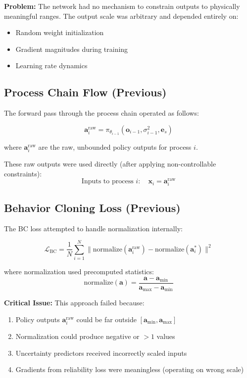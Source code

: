 \documentclass[11pt,a4paper]{article}
\begin{document}
\textbf{Problem:} The network had no mechanism to constrain outputs to physically meaningful ranges. The output scale was arbitrary and depended entirely on:
\begin{itemize}
    \item Random weight initialization
    \item Gradient magnitudes during training
    \item Learning rate dynamics
\end{itemize}

\subsection{Process Chain Flow (Previous)}

The forward pass through the process chain operated as follows:

\begin{equation}
\mathbf{a}_i^{\text{raw}} = \pi_{\theta_{i-1}}(\mathbf{o}_{i-1}, \sigma^2_{i-1}, \mathbf{e}_s)
\end{equation}

where $\mathbf{a}_i^{\text{raw}}$ are the raw, unbounded policy outputs for process $i$.

These raw outputs were used directly (after applying non-controllable constraints):
\begin{equation}
\text{Inputs to process } i: \quad \mathbf{x}_i = \mathbf{a}_i^{\text{raw}}
\end{equation}

\subsection{Behavior Cloning Loss (Previous)}

The BC loss attempted to handle normalization internally:

\begin{equation}
\mathcal{L}_{\text{BC}} = \frac{1}{N} \sum_{i=1}^N \| \text{normalize}(\mathbf{a}_i^{\text{raw}}) - \text{normalize}(\mathbf{a}_i^*) \|^2
\end{equation}

where normalization used precomputed statistics:
\begin{equation}
\text{normalize}(\mathbf{a}) = \frac{\mathbf{a} - \mathbf{a}_{\min}}{\mathbf{a}_{\max} - \mathbf{a}_{\min}}
\end{equation}

\textbf{Critical Issue:} This approach failed because:
\begin{enumerate}
    \item Policy outputs $\mathbf{a}_i^{\text{raw}}$ could be far outside $[\mathbf{a}_{\min}, \mathbf{a}_{\max}]$
    \item Normalization could produce negative or $>1$ values
    \item Uncertainty predictors received incorrectly scaled inputs
    \item Gradients from reliability loss were meaningless (operating on wrong scale)
\end{enumerate}
\end{document}
